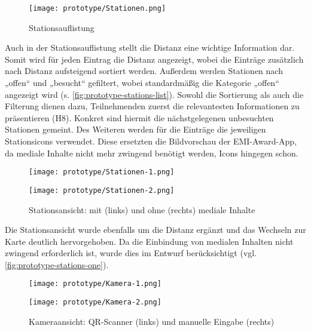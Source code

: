 
\begin{figure}[htpb]
    \centering
    \texttt{[image: prototype/Stationen.png]}
    \caption{Stationsauflistung}
    \label{fig:prototype-stations-list}
\end{figure}

Auch in der Stationsauflistung stellt die Distanz eine wichtige Information dar.
Somit wird für jeden Eintrag die Distanz angezeigt, wobei die Einträge
zusätzlich nach Distanz aufsteigend sortiert werden. Außerdem werden Stationen
nach „offen“ und „besucht“ gefiltert, wobei standardmäßig die Kategorie „offen“
angezeigt wird (s. \autoref{fig:prototype-stations-list}). Sowohl die Sortierung als auch die Filterung dienen dazu,
Teilnehmenden zuerst die relevantesten Informationen zu präsentieren (H8).
Konkret sind hiermit die nächstgelegenen unbesuchten Stationen gemeint. Des
Weiteren werden für die Einträge die jeweiligen Stationsicons verwendet. Diese
ersetzten die Bildvorschau der EMI-Award-App, da mediale Inhalte nicht mehr
zwingend benötigt werden, Icons hingegen schon.

\begin{figure}[htpb]
    \begin{minipage}{.5\textwidth}
        \centering
        \texttt{[image: prototype/Stationen-1.png]}
    \end{minipage}%
    \begin{minipage}{.5\textwidth}
        \centering
        \texttt{[image: prototype/Stationen-2.png]}
    \end{minipage}
    \caption{Stationsansicht: mit (links) und ohne (rechts) mediale Inhalte}
    \label{fig:prototype-stations-one}
\end{figure}

Die Stationsansicht wurde ebenfalls um die Distanz ergänzt und das
Wechseln zur Karte deutlich hervorgehoben. Da die Einbindung von medialen
Inhalten nicht zwingend erforderlich ist, wurde dies im Entwurf berücksichtigt
(vgl. \autoref{fig:prototype-stations-one}).

\begin{figure}[htpb]
    \begin{minipage}{.5\textwidth}
        \centering
        \texttt{[image: prototype/Kamera-1.png]}
    \end{minipage}%
    \begin{minipage}{.5\textwidth}
        \centering
        \texttt{[image: prototype/Kamera-2.png]}
    \end{minipage}
    \caption{Kameraansicht: QR-Scanner (links) und manuelle Eingabe (rechts)}
    \label{fig:prototype-camera}
\end{figure}

